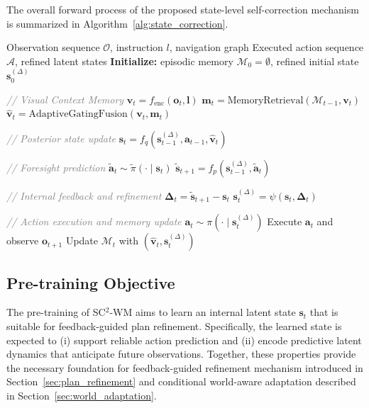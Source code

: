 \documentclass{article}
\theoremstyle{plain}
\theoremstyle{definition}
\theoremstyle{remark}
\begin{document}
The overall forward process of the proposed state-level self-correction mechanism is summarized in Algorithm~\ref{alg:state_correction}.

\begin{algorithm}[htbp]
\caption{Feedback-Guided Plan Refinement \textit{(Forward Pass)}}
\label{alg:state_correction}
\begin{algorithmic}[1]
\REQUIRE Observation sequence \(\mathcal{O}\), instruction \(l\), navigation graph
\ENSURE Executed action sequence \(\mathcal{A}\), refined latent states
\STATE \textbf{Initialize:} episodic memory \(\mathcal{M}_0 = \emptyset\), refined initial state \(\boldsymbol{s}_0^{(\Delta)}\)

    \STATE \textcolor{gray}{\textit{// Visual Context Memory}}
    \STATE \(\boldsymbol{v}_t = f_{\mathrm{enc}}(\boldsymbol{o}_t, \boldsymbol{l})\)
    \STATE \(\boldsymbol{m}_t = \mathrm{MemoryRetrieval}(\mathcal{M}_{t-1}, \boldsymbol{v}_t)\)
    \STATE \(\boldsymbol{\hat{v}}_t = \mathrm{AdaptiveGatingFusion}(\boldsymbol{v}_t, \boldsymbol{m}_t)\)
    
    \STATE \textcolor{gray}{\textit{// Posterior state update}}
    \STATE \(\boldsymbol{s}_t = f_q(\boldsymbol{s}_{t-1}^{({\Delta})}, \boldsymbol{a}_{t-1}, \boldsymbol{\hat{v}}_t)\)
    
    \STATE \textcolor{gray}{\textit{// Foresight prediction}}
    \STATE \(\boldsymbol{\tilde{a}}_t \sim \tilde{\pi}(\cdot \mid \boldsymbol{s}_t)\)
    \STATE \(\boldsymbol{\tilde{s}}_{t+1} = f_p(\boldsymbol{s}_{t-1}^{({\Delta})}, \boldsymbol{\tilde{a}}_t)\)
    
    \STATE \textcolor{gray}{\textit{// Internal feedback and refinement}}
    \STATE \(\boldsymbol{\Delta}_t = \boldsymbol{\tilde{s}}_{t+1} - \boldsymbol{s}_t\)
    \STATE \(\boldsymbol{s}_t^{(\Delta)} = \psi(\boldsymbol{s}_t, \boldsymbol{\Delta}_t)\)
    
    \STATE \textcolor{gray}{\textit{// Action execution and memory update}}
    \STATE \(\boldsymbol{a}_t \sim \pi(\cdot \mid \boldsymbol{s}_t^{({\Delta})})\)
    \STATE Execute \(\boldsymbol{a}_t\) and observe \(\boldsymbol{o}_{t+1}\)
    \STATE Update \(\mathcal{M}_t\) with \((\boldsymbol{\hat{v}}_t, \boldsymbol{s}_t^{(\Delta)})\)
\ENDFOR
\end{algorithmic}
\end{algorithm}






\subsection{Pre-training Objective}
\label{sec:training}
The pre-training of SC$^{2}$-WM aims to learn an internal latent state $\boldsymbol{s}_t$ that is suitable for feedback-guided plan refinement.
Specifically, the learned state is expected to (i) support reliable action prediction and (ii) encode predictive latent dynamics that anticipate future observations.
Together, these properties provide the necessary foundation for feedback-guided refinement mechanism introduced in Section~\ref{sec:plan_refinement} and conditional world-aware adaptation described in Section~\ref{sec:world_adaptation}.
\end{document}
